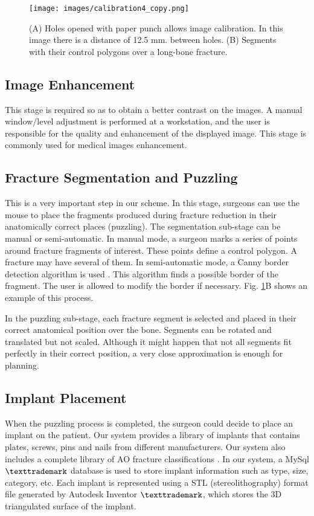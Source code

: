 \documentclass{cimenics}
\begin{document}
\begin{figure}[htb]
    \centering
    \texttt{[image: images/calibration4\_copy.png]}
    \caption{(A) Holes opened with paper punch allows image calibration. In this image there is a distance of 12.5 mm. between holes.
    (B) Segments with their control polygons over a long-bone fracture.}
    \label{fig:cal}
\end{figure}

\subsection{Image Enhancement}

This stage is required so as to obtain a better contrast on the
images. A manual window/level adjustment is performed at a
workstation, and the user is responsible for the quality and
enhancement of the displayed image. This stage is commonly used
for medical images enhancement.

\subsection{Fracture Segmentation and Puzzling}

%
This is a very important step in our scheme. In this stage,
surgeons can use the mouse to place the fragments produced during
fracture reduction in their anatomically correct places
(puzzling). The segmentation sub-stage can be manual or
semi-automatic. In manual mode, a surgeon marks a series of points
around fracture fragments of interest. These points define a
control polygon. A fracture may have several of them. In
semi-automatic mode, a Canny border detection algorithm is used
\cite{CANNY86}. This algorithm finds a possible border of the
fragment. The user is allowed to modify the border if necessary.
Fig. \ref{fig:cal}\color{red}B \color{black} shows an example of
this process.

In the puzzling sub-stage, each fracture segment is selected and
placed in their correct anatomical position over the bone.
Segments can be rotated and translated but not scaled. Although it
might happen that not all segments fit perfectly in their correct
position, a very close approximation is enough for planning.

\subsection{Implant Placement}

When the puzzling process is completed, the surgeon could decide
to place an implant on the patient. Our system provides a library of
implants that contains plates, screws, pins and nails from
different manufacturers. Our system also includes a complete
library of AO fracture classifications \cite{RUEDI03}. In our
system, a MySql$\texttrademark$ database is used to store implant information such
as type, size, category, etc. Each implant is represented using a
STL (stereolithography) format file generated by Autodesk
Inventor $\texttrademark$, which stores the 3D triangulated surface of the implant.
\end{document}
